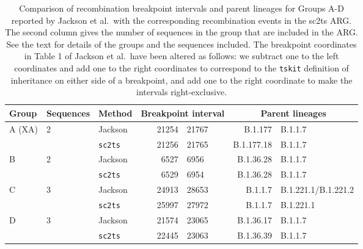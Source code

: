 \documentclass[12pt]{article}
\begin{document}
\begin{table}
\centering
\caption{
Comparison of recombination breakpoint
intervals and parent lineages for Groups A-D
reported by Jackson et al.\ with the corresponding
recombination events in the sc2ts ARG.
The second column gives the number of sequences in the group
that are included in the ARG.
See the text for details of the groups and the sequences included.
The breakpoint coordinates in Table 1 of Jackson et al.\ have been altered as follows:
we subtract one to the left coordinates and add one to the right coordinates
to correspond to the \texttt{tskit} definition of inheritance on either side of a breakpoint,
and add one to the right coordinate to make the intervals right-exclusive.
}
\label{tab:jackson}
\begin{tabular}{lllr@{--}lr@{+}l}
\toprule
Group & Sequences & Method & \multicolumn{2}{c}{Breakpoint interval} & \multicolumn{2}{c}{Parent lineages} \\
\midrule
A (XA)       & 2   & Jackson        &  21254&21767 & B.1.177&B.1.1.7 \\
             &     &\texttt{sc2ts} &  21256&21765 & B.1.177.18&B.1.1.7 \\
\cmidrule{3-7}
B            & 2   & Jackson        &  6527&6956 & B.1.36.28&B.1.1.7  \\
             &     &\texttt{sc2ts} &   6529&6954 & B.1.36.28&B.1.1.7  \\
\cmidrule{3-7}
C            & 3   &Jackson         &  24913&28653 &  B.1.1.7&B.1.221.1/B.1.221.2 \\
             &     &\texttt{sc2ts} &  25997&27972 &  B.1.1.7&B.1.221.1 \\
\cmidrule{3-7}
D            & 3   & Jackson        &  21574&23065 &  B.1.36.17&B.1.1.7 \\
             &     &\texttt{sc2ts} &  22445&23063 &  B.1.36.39&B.1.1.7 \\
\bottomrule
\end{tabular}
\end{table}
\end{document}
